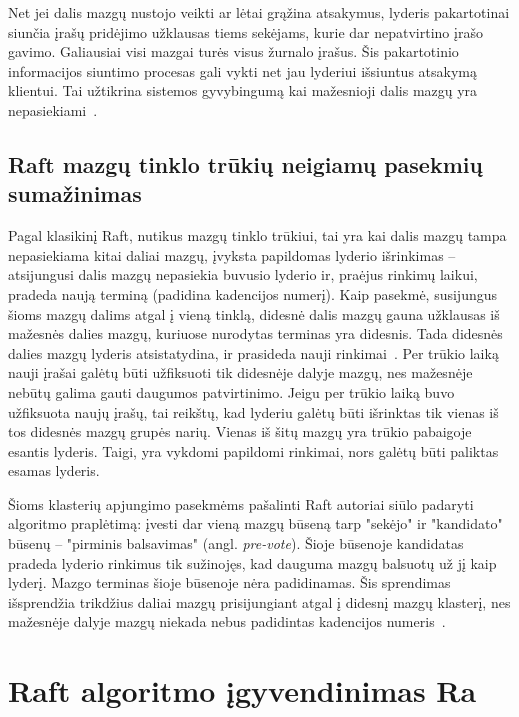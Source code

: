 \documentclass{VUMIFPSkursinis}
\begin{document}
Net jei dalis mazgų nustojo veikti ar lėtai grąžina atsakymus, lyderis pakartotinai siunčia įrašų pridėjimo užklausas tiems sekėjams, kurie dar nepatvirtino įrašo gavimo. Galiausiai visi mazgai turės visus žurnalo įrašus. Šis pakartotinio informacijos siuntimo procesas gali vykti net jau lyderiui išsiuntus atsakymą klientui. Tai užtikrina sistemos gyvybingumą kai mažesnioji dalis mazgų yra nepasiekiami~\cite{ongaro_consensus}.

\subsection{Raft mazgų tinklo trūkių neigiamų pasekmių sumažinimas}

Pagal klasikinį Raft, nutikus mazgų tinklo trūkiui, tai yra kai dalis mazgų tampa nepasiekiama kitai daliai mazgų, įvyksta papildomas lyderio išrinkimas -- atsijungusi dalis mazgų nepasiekia buvusio lyderio ir, praėjus rinkimų laikui, pradeda naują terminą (padidina kadencijos numerį). Kaip pasekmė, susijungus šioms mazgų dalims atgal į vieną tinklą, didesnė dalis mazgų gauna užklausas iš mažesnės dalies mazgų, kuriuose nurodytas terminas yra didesnis. Tada didesnės dalies mazgų lyderis atsistatydina, ir prasideda nauji rinkimai~\cite{ongaro_consensus}. Per trūkio laiką nauji įrašai galėtų būti užfiksuoti tik didesnėje dalyje mazgų, nes mažesnėje nebūtų galima gauti daugumos patvirtinimo. Jeigu per trūkio laiką buvo užfiksuota naujų įrašų, tai reikštų, kad lyderiu galėtų būti išrinktas tik vienas iš tos didesnės mazgų grupės narių. Vienas iš šitų mazgų yra trūkio pabaigoje esantis lyderis. Taigi, yra vykdomi papildomi rinkimai, nors galėtų būti paliktas esamas lyderis.

Šioms klasterių apjungimo pasekmėms pašalinti Raft autoriai siūlo padaryti algoritmo praplėtimą: įvesti dar vieną mazgų būseną tarp "sekėjo" ir "kandidato" būsenų -- "pirminis balsavimas" (angl. \textit{pre-vote}). Šioje būsenoje kandidatas pradeda lyderio rinkimus tik sužinojęs, kad dauguma mazgų balsuotų už jį kaip lyderį. Mazgo terminas šioje būsenoje nėra padidinamas. Šis sprendimas išsprendžia trikdžius daliai mazgų prisijungiant atgal į didesnį mazgų klasterį, nes mažesnėje dalyje mazgų niekada nebus padidintas kadencijos numeris~\cite{ongaro_consensus}.

\section{Raft algoritmo įgyvendinimas Ra}
\end{document}
